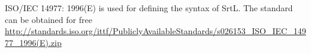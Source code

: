 ISO/IEC 14977: 1996(E) is used for defining the syntax of SrtL. The standard can
be obtained for free \url{http://standards.iso.org/ittf/PubliclyAvailableStandards/s026153_ISO_IEC_14977_1996(E).zip}